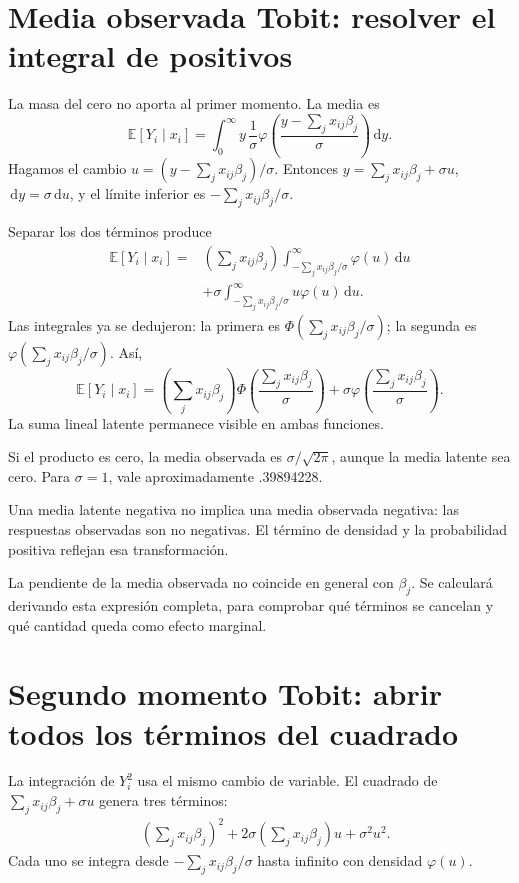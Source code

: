 \documentclass[11pt,a4paper]{article}
\newcommand{\E}{\mathbb E}
\newcommand{\dd}{\,\mathrm d}
\begin{document}
\clearpage
\section{Media observada Tobit: resolver el integral de positivos}\label{unidad85}
La masa del cero no aporta
al primer momento. La media es
\[
\E[Y_i\mid x_i]
=\int_0^\infty y\,\frac1\sigma
\varphi\left(\frac{y-\sum_jx_{ij}\beta_j}{\sigma}\right)\dd y.
\]
Hagamos el cambio
\(u=(y-\sum_jx_{ij}\beta_j)/\sigma\).
Entonces \(y=\sum_jx_{ij}\beta_j+\sigma u\),
\(\dd y=\sigma\dd u\),
y el límite inferior es
\(-\sum_jx_{ij}\beta_j/\sigma\).

Separar los dos términos produce
\[
\begin{aligned}
\E[Y_i\mid x_i]
={}&\left(\sum_jx_{ij}\beta_j\right)
\int_{-\sum_jx_{ij}\beta_j/\sigma}^\infty\varphi(u)\dd u\\
&+\sigma\int_{-\sum_jx_{ij}\beta_j/\sigma}^\infty u\varphi(u)\dd u.
\end{aligned}
\]
Las integrales ya se dedujeron:
la primera es \(\Phi(\sum_jx_{ij}\beta_j/\sigma)\);
la segunda es \(\varphi(\sum_jx_{ij}\beta_j/\sigma)\).
Así,
\[
\boxed{
\E[Y_i\mid x_i]
=\left(\sum_jx_{ij}\beta_j\right)
\Phi\left(\frac{\sum_jx_{ij}\beta_j}{\sigma}\right)
+\sigma\varphi\left(\frac{\sum_jx_{ij}\beta_j}{\sigma}\right)}.
\]
La suma lineal latente permanece visible
en ambas funciones.

\begin{ejemplo}
Si el producto es cero,
la media observada es \(\sigma/\sqrt{2\pi}\),
aunque la media latente sea cero.
Para \(\sigma=1\), vale aproximadamente .39894228.
\end{ejemplo}
Una media latente negativa no
implica una media observada negativa:
las respuestas observadas son no negativas.
El término de densidad y la
probabilidad positiva reflejan
esa transformación.

La pendiente de la media observada
no coincide en general con \(\beta_j\).
Se calculará derivando esta
expresión completa, para comprobar
qué términos se cancelan y
qué cantidad queda como efecto marginal.

\clearpage
\section{Segundo momento Tobit: abrir todos los términos del cuadrado}\label{unidad86}
La integración de \(Y_i^2\) usa
el mismo cambio de variable.
El cuadrado de
\(\sum_jx_{ij}\beta_j+\sigma u\)
genera tres términos:
\[
\begin{aligned}
&\left(\sum_jx_{ij}\beta_j\right)^2
+2\sigma\left(\sum_jx_{ij}\beta_j\right)u
+\sigma^2u^2.
\end{aligned}
\]
Cada uno se integra desde
\(-\sum_jx_{ij}\beta_j/\sigma\)
hasta infinito con densidad \(\varphi(u)\).
\end{document}
